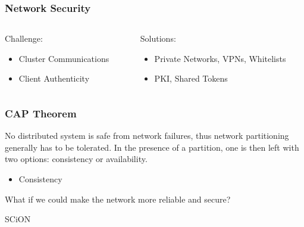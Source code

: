 \documentclass[aspectratio=169]{beamer}
\begin{document}
\begin{frame}
  \frametitle{Network Security}
    \begin{columns}[t]
      \begin{column}{0.48\linewidth}
        \pause
        Challenge:
        \begin{itemize}
            \item<3-> Cluster Communications
            \item<5-> Client Authenticity
        \end{itemize}
    \end{column}
    \begin{column}{0.48\linewidth}
        Solutions:
        \pause
        \begin{itemize}
            \item<4-> Private Networks, VPNs, Whitelists
            \item<6-> PKI, Shared Tokens
        \end{itemize}
    \end{column}
  \end{columns}
\end{frame}

\begin{frame}
\frametitle{CAP Theorem}
  No distributed system is safe from network failures, thus network partitioning generally has to be tolerated. In the presence of a partition, one is then left with two options: consistency or availability.
  \newline
  \begin{itemize}[<alert@+>]
    \item Consistency
    \note[item]{}
  \end{itemize}
\end{frame}

\begin{frame}[c]
  \begin{center}
    \Huge{What if we could make the network more reliable and secure?}
  \end{center}
\end{frame}

\begin{frame}[c]
  \begin{center}
    \Huge{SCiON}
  \end{center}
\end{frame}
\end{document}
